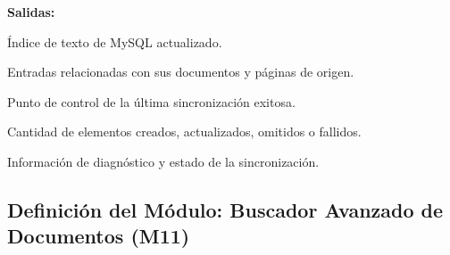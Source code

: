 \begin{definicionmodulo}
\textbf{Salidas:}
\begin{elementosmodulo}
    \item Índice de texto de MySQL actualizado.
    \item Entradas relacionadas con sus documentos y páginas de origen.
    \item Punto de control de la última sincronización exitosa.
    \item Cantidad de elementos creados, actualizados, omitidos o fallidos.
    \item Información de diagnóstico y estado de la sincronización.
\end{elementosmodulo}

\end{definicionmodulo}



\subsection{Definición del Módulo: Buscador Avanzado de Documentos (M11)}
\label{subsec:modulo_m11}

